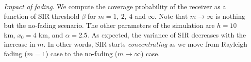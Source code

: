 \documentclass[journal,draftclsnofoot,onecolumn,12pt]{IEEEtran}
\begin{document}
{\em Impact of fading}. We compute the coverage probability of the receiver as a function of SIR threshold $\beta$ for $m = 1,\ 2,\ 4$ and $\infty$. Note that $m \to \infty$ is nothing but the no-fading scenario. The other parameters of the simulation are $h=10$ km, $x_0 = 4$ km, and $\alpha = 2.5$. As expected, the variance of SIR decreases with the increase in $m$. In other words, SIR starts {\em concentrating} as we move from Rayleigh fading ($m=1$) case to the no-fading ($m\rightarrow \infty$) case. 
\end{document}
